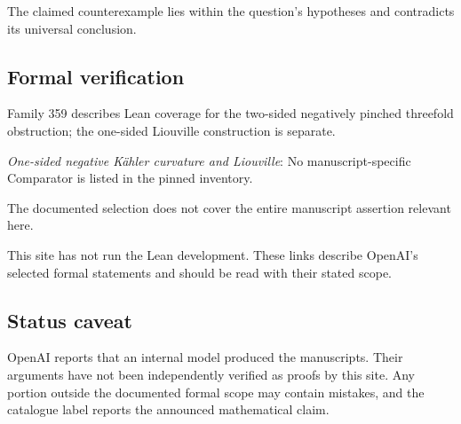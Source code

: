 \documentclass[11pt]{article}
\begin{document}
The claimed counterexample lies within the question’s hypotheses and contradicts its universal conclusion.

\subsection{Formal verification}
Family 359 describes Lean coverage for the two-sided negatively pinched threefold obstruction; the one-sided Liouville construction is separate.

\textit{One-sided negative Kähler curvature and Liouville}: No manuscript-specific Comparator is listed in the pinned inventory.

The documented selection does not cover the entire manuscript assertion relevant here.

This site has not run the Lean development. These links describe OpenAI’s selected formal statements and should be read with their stated scope.

\subsection{Status caveat}
OpenAI reports that an internal model produced the manuscripts. Their arguments have not been independently verified as proofs by this site. Any portion outside the documented formal scope may contain mistakes, and the catalogue label reports the announced mathematical claim.
\end{document}
